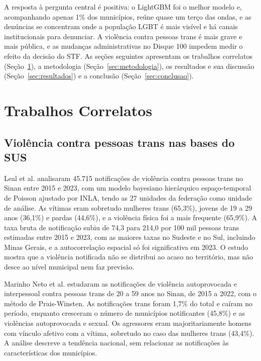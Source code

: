 \documentclass[12pt]{article}
\begin{document}
A resposta à pergunta central é positiva: o LightGBM foi o melhor modelo e, acompanhando apenas 1\% dos municípios, reúne quase um terço das ondas, e as denúncias se concentram onde a população LGBT é mais visível e há canais institucionais para denunciar. A violência contra pessoas trans é mais grave e mais pública, e as mudanças administrativas no Disque 100 impedem medir o efeito da decisão do STF. As seções seguintes apresentam os trabalhos correlatos (Seção~\ref{sec:correlatos}), a metodologia (Seção~\ref{sec:metodologia}), os resultados e sua discussão (Seção~\ref{sec:resultados}) e a conclusão (Seção~\ref{sec:conclusao}).


\clearpage
\section{Trabalhos Correlatos}
\label{sec:correlatos}

\subsection{Violência contra pessoas trans nas bases do SUS}

Leal et al. \cite{leal_silva_lizzi:2026} analisaram 45.715 notificações de violência contra pessoas trans no Sinan entre 2015 e 2023, com um modelo bayesiano hierárquico espaço-temporal de Poisson ajustado por INLA, tendo as 27 unidades da federação como unidade de análise. As vítimas eram sobretudo mulheres trans (65,3\%), jovens de 19 a 29 anos (36,1\%) e pardas (44,6\%), e a violência física foi a mais frequente (65,9\%). A taxa bruta de notificação subiu de 74,3 para 214,0 por 100 mil pessoas trans estimadas entre 2015 e 2023, com as maiores taxas no Sudeste e no Sul, incluindo Minas Gerais, e a autocorrelação espacial só foi significativa em 2023. O estudo mostra que a violência notificada não se distribui ao acaso no território, mas não desce ao nível municipal nem faz previsão.

Marinho Neto et al. \cite{marinho_tomazelli_firianelli:2024} estudaram as notificações de violência autoprovocada e interpessoal contra pessoas trans de 20 a 59 anos no Sinan, de 2015 a 2022, com o método de Prais-Winsten. As notificações trans foram 1,7\% do total e caíram no período, enquanto cresceram o número de municípios notificantes (45,8\%) e as violências autoprovocada e sexual. Os agressores eram majoritariamente homens com vínculo afetivo com a vítima, sobretudo no caso das mulheres trans (43,4\%). A análise descreve a tendência nacional, sem relacionar as notificações às características dos municípios.
\end{document}
